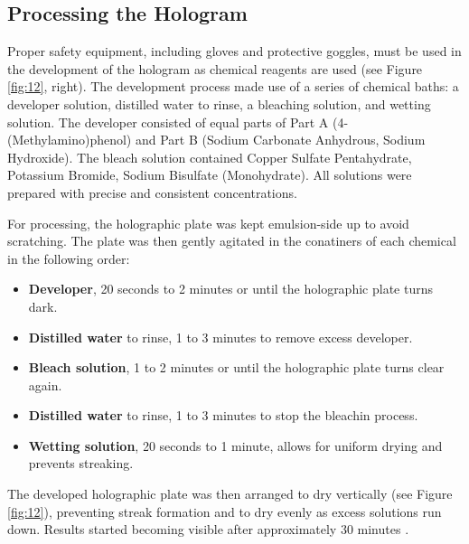 \documentclass[12pt]{article}
\begin{document}
\subsection{Processing the Hologram}

Proper safety equipment, including gloves and  protective goggles, must be used in the development of the hologram as chemical reagents are used (see Figure \ref{fig:12}, right). The development process made use of a series of chemical baths: a developer solution, distilled water to rinse, a bleaching solution, and wetting solution.
The developer consisted of equal parts of Part A (4-(Methylamino)phenol) and Part B (Sodium Carbonate Anhydrous, Sodium Hydroxide). The
bleach solution contained Copper Sulfate Pentahydrate, Potassium Bromide, Sodium Bisulfate (Monohydrate). All solutions were prepared with precise and consistent concentrations.

For processing, the holographic plate was kept emulsion-side up to avoid scratching. The plate was then gently agitated in the conatiners of each chemical in the following order:

\begin{itemize}
    \item \textbf{Developer}, 20 seconds to 2 minutes or until the holographic plate turns dark.
    \item \textbf{Distilled water} to rinse, 1 to 3 minutes to remove excess developer.
    \item \textbf{Bleach solution}, 1 to 2 minutes or until the holographic plate turns clear again.
    \item \textbf{Distilled water} to rinse, 1 to 3 minutes to stop the bleachin process.
    \item \textbf{Wetting solution}, 20 seconds to 1 minute, allows for uniform drying and prevents streaking.
\end{itemize}

The developed holographic plate was then arranged to dry vertically (see Figure \ref{fig:12}), preventing streak formation and to dry evenly as excess solutions run down. Results started becoming visible after approximately 30 minutes \cite{UCDholo}.
\end{document}
